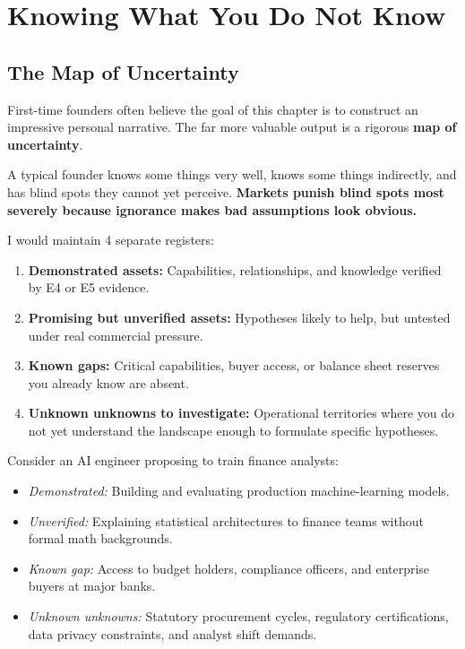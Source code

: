 \section{Knowing What You Do Not Know}

\subsection{The Map of Uncertainty}

First-time founders often believe the goal of this chapter is to construct an impressive personal narrative. The far more valuable output is a rigorous \textbf{map of uncertainty}.

A typical founder knows some things very well, knows some things indirectly, and has blind spots they cannot yet perceive. \textbf{Markets punish blind spots most severely because ignorance makes bad assumptions look obvious.}

I would maintain 4 separate registers:

\begin{enumerate}[label=\textbf{\arabic*.},leftmargin=11pt,itemsep=1.5pt,topsep=1.5pt,parsep=0pt]
  \item \textbf{Demonstrated assets:} Capabilities, relationships, and knowledge verified by E4 or E5 evidence.
  \item \textbf{Promising but unverified assets:} Hypotheses likely to help, but untested under real commercial pressure.
  \item \textbf{Known gaps:} Critical capabilities, buyer access, or balance sheet reserves you already know are absent.
  \item \textbf{Unknown unknowns to investigate:} Operational territories where you do not yet understand the landscape enough to formulate specific hypotheses.
\end{enumerate}

Consider an AI engineer proposing to train finance analysts:
\begin{itemize}[leftmargin=11pt,itemsep=1.5pt,topsep=1.5pt,parsep=0pt]
  \item \textit{Demonstrated:} Building and evaluating production machine-learning models.
  \item \textit{Unverified:} Explaining statistical architectures to finance teams without formal math backgrounds.
  \item \textit{Known gap:} Access to budget holders, compliance officers, and enterprise buyers at major banks.
  \item \textit{Unknown unknowns:} Statutory procurement cycles, regulatory certifications, data privacy constraints, and analyst shift demands.
\end{itemize}

